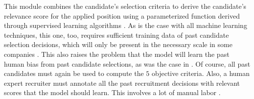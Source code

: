 \documentclass[draft,final]{thesisclass} %
\begin{document}
\begin{itemize}
    This module combines the candidate's selection criteria to derive the candidate's relevance score for the applied position using a parameterized function derived through supervised learning algorithms \parencite[518]{applicant_semantic_matching}.
    As is the case with all machine learning techniques, this one, too, requires sufficient training data of past candidate selection decisions, which will only be present in the necessary scale in some companies \parencite[523]{applicant_semantic_matching}.
    This also raises the problem that the model will learn the past human bias from past candidate selections, as was the case in \textcite[9]{bias_ai_hiring}.
    Of course, all past candidates must again be used to compute the $5$ objective criteria. Also, a human expert recruiter must annotate all the past recruitment decisions with relevant scores that the model should learn. This involves a lot of manual labor \parencite[523-524]{applicant_semantic_matching}.
\end{itemize}
\end{document}
